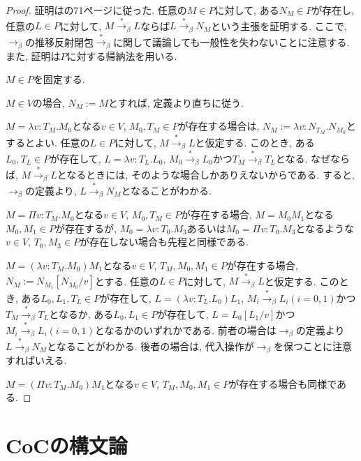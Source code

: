 \documentclass{ltjsarticle}
\begin{document}
\begin{proof}
 証明は\cite{高橋正子1991計算論}の71ページに従った.
任意の$M \in P$に対して, ある$N_M \in P$が存在し, 任意の$L \in P$に対して, 
$M \overset{*}{\rightarrow}_\beta L$ならば$L \overset{*}{\rightarrow}_\beta N_M$という主張を証明する.
ここで, $\rightarrow_\beta$の推移反射閉包$\overset{*}{\rightarrow}_\beta$に関して議論しても一般性を失わないことに注意する.
また, 証明は$P$に対する帰納法を用いる.

$M \in P$を固定する.

$M \in V$の場合, $N_M := M$とすれば, 定義より直ちに従う.

$M = \lambda v \colon T_M . M_0$となる$v \in V$, $M_0, T_M \in P$が存在する場合は, $N_M := \lambda v \colon N_{T_M} . N_{M_0}$とするとよい.
任意の$L \in P$に対して, $M \overset{*}{\rightarrow}_\beta L$と仮定する.
このとき, ある$L_0, T_L \in P$が存在して, $L = \lambda v \colon T_L . L_0$, $M_0 \overset{*}{\rightarrow}_\beta L_0$かつ$T_M \overset{*}{\rightarrow}_\beta T_L$となる.
なぜならば, $M \overset{*}{\rightarrow}_\beta L$となるときには, そのような場合しかありえないからである.
すると, $\rightarrow_{\beta}$の定義より, $L \overset{*}{\rightarrow}_\beta N_M$となることがわかる.

$M = \Pi v \colon T_M . M_0$となる$v \in V$, $M_0, T_M \in P$が存在する場合, 
$M = M_0 M_1$となる$M_0, M_1 \in P$が存在するが, $M_0 = \lambda v \colon T_0 . M_3$あるいは$M_0 = \Pi v \colon T_0 . M_3$となるような$v \in V$, $T_0, M_3 \in P$が存在しない場合も先程と同様である.

$M = (\lambda v : T_M . M_0) M_1$となる$v \in V$, $T_M, M_0, M_1 \in P$が存在する場合, $N_M := N_{M_1}[N_{M_0}/v]$とする.
任意の$L \in P$に対して, $M \overset{*}{\rightarrow}_\beta L$と仮定する.
このとき, ある$L_0, L_1, T_L \in P$が存在して, $L = (\lambda v \colon T_L . L_0) L_1$, $M_i \overset{*}{\rightarrow}_\beta L_i (i = 0, 1)$かつ$T_M \overset{*}{\rightarrow}_\beta T_L$となるか,
ある$L_0, L_1 \in P$が存在して, $L = L_0[L_1/v]$かつ$M_i \overset{*}{\rightarrow}_\beta L_i (i = 0, 1)$となるかのいずれかである.
前者の場合は$\rightarrow_{\beta}$の定義より$L \overset{*}{\rightarrow}_\beta N_M$となることがわかる.
後者の場合は, 代入操作が$\rightarrow_{\beta}$を保つことに注意すればいえる.

$M = (\Pi v : T_M . M_0) M_1$となる$v \in V$, $T_M, M_0, M_1 \in P$が存在する場合も同様である.
\end{proof}


\section{CoCの構文論}
\end{document}
